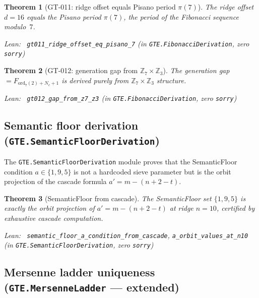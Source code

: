 \documentclass[11pt,a4paper]{article}
\newenvironment{leanref}%
  {\par\smallskip\noindent\begingroup\raggedright\textup{Lean:}~}%
  {\par\endgroup}
\newtheorem{theorem}{Theorem}[section]
\theoremstyle{definition}
\begin{document}
\begin{theorem}[GT-011: ridge offset equals Pisano period $\pi(7)$]\label{thm:pisano-7}
The ridge offset $d = 16$ equals the Pisano period $\pi(7)$, the period of the
Fibonacci sequence modulo~$7$.

\begin{leanref}
\lstinline|gt011_ridge_offset_eq_pisano_7|
\textup{(in \texttt{GTE.FibonacciDerivation}, zero \texttt{sorry})}
\end{leanref}
\end{theorem}

\begin{theorem}[GT-012: generation gap from $\mathbb{Z}_7 \times \mathbb{Z}_3$]\label{thm:gen-gap}
The generation gap $= F_{\mathrm{ord}_7(2) + N_c + 1}$ is derived purely from
$\mathbb{Z}_7 \times \mathbb{Z}_3$ structure.

\begin{leanref}
\lstinline|gt012_gap_from_z7_z3|
\textup{(in \texttt{GTE.FibonacciDerivation}, zero \texttt{sorry})}
\end{leanref}
\end{theorem}

\subsection{Semantic floor derivation (\texttt{GTE.SemanticFloorDerivation})}\label{subsec:semantic-floor-derivation}

The \texttt{GTE.SemanticFloorDerivation} module proves that the SemanticFloor
condition $a \in \{1, 9, 5\}$ is not a hardcoded sieve parameter but is
the orbit projection of the cascade formula $a' = m - (n+2-t)$.

\begin{theorem}[SemanticFloor from cascade]\label{thm:semantic-floor-cascade}
The SemanticFloor set $\{1, 9, 5\}$ is exactly the orbit projection of
$a' = m - (n+2-t)$ at ridge $n = 10$, certified by exhaustive
cascade computation.

\begin{leanref}
\lstinline|semantic_floor_a_condition_from_cascade|, \lstinline|a_orbit_values_at_n10|
\textup{(in \texttt{GTE.SemanticFloorDerivation}, zero \texttt{sorry})}
\end{leanref}
\end{theorem}

\subsection{Mersenne ladder uniqueness (\texttt{GTE.MersenneLadder} — extended)}\label{subsec:mersenne-ladder-unique}
\end{document}
